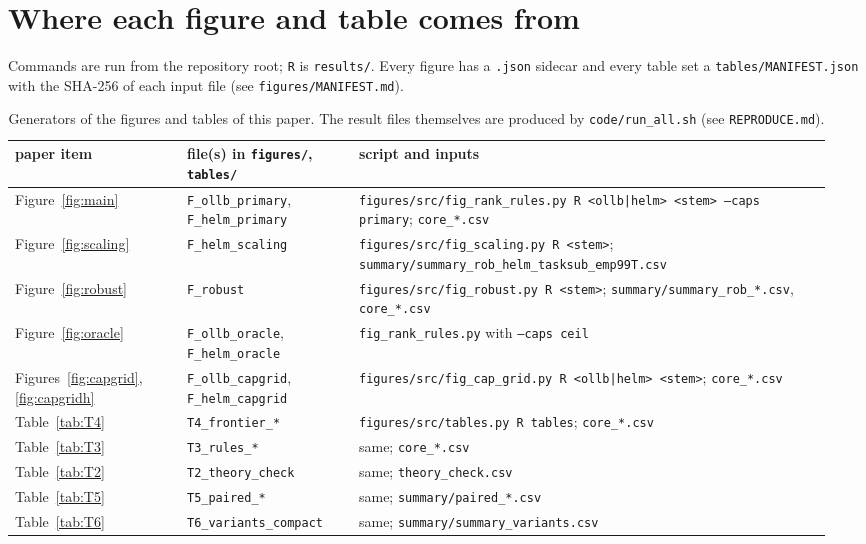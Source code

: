 \documentclass{article}
\begin{document}
\section{Where each figure and table comes from}
\label{app:map}
Commands are run from the repository root; \texttt{R} is \texttt{results/}. Every figure has a \texttt{.json} sidecar and every table set a \texttt{tables/MANIFEST.json} with the SHA-256 of each input file (see \texttt{figures/MANIFEST.md}).
\begin{table}[h]
\centering\scriptsize
\begin{tabular}{@{}p{0.2\linewidth}p{0.2\linewidth}p{0.55\linewidth}@{}}
\toprule
paper item & file(s) in \texttt{figures/}, \texttt{tables/} & script and inputs \\
\midrule
Figure~\ref{fig:main} & \texttt{F\_ollb\_primary}, \texttt{F\_helm\_primary} & \texttt{figures/src/fig\_rank\_rules.py R <ollb|helm> <stem> --caps primary}; \texttt{core\_*.csv} \\
Figure~\ref{fig:scaling} & \texttt{F\_helm\_scaling} & \texttt{figures/src/fig\_scaling.py R <stem>}; \texttt{summary/summary\_rob\_helm\_tasksub\_emp99T.csv} \\
Figure~\ref{fig:robust} & \texttt{F\_robust} & \texttt{figures/src/fig\_robust.py R <stem>}; \texttt{summary/summary\_rob\_*.csv}, \texttt{core\_*.csv} \\
Figure~\ref{fig:oracle} & \texttt{F\_ollb\_oracle}, \texttt{F\_helm\_oracle} & \texttt{fig\_rank\_rules.py} with \texttt{--caps ceil} \\
Figures~\ref{fig:capgrid}, \ref{fig:capgridh} & \texttt{F\_ollb\_capgrid}, \texttt{F\_helm\_capgrid} & \texttt{figures/src/fig\_cap\_grid.py R <ollb|helm> <stem>}; \texttt{core\_*.csv} \\
Table~\ref{tab:T4} & \texttt{T4\_frontier\_*} & \texttt{figures/src/tables.py R tables}; \texttt{core\_*.csv} \\
Table~\ref{tab:T3} & \texttt{T3\_rules\_*} & same; \texttt{core\_*.csv} \\
Table~\ref{tab:T2} & \texttt{T2\_theory\_check} & same; \texttt{theory\_check.csv} \\
Table~\ref{tab:T5} & \texttt{T5\_paired\_*} & same; \texttt{summary/paired\_*.csv} \\
Table~\ref{tab:T6} & \texttt{T6\_variants\_compact} & same; \texttt{summary/summary\_variants.csv} \\
\bottomrule
\end{tabular}
\caption{Generators of the figures and tables of this paper. The result files themselves are produced by \texttt{code/run\_all.sh} (see \texttt{REPRODUCE.md}).}
\end{table}
\end{document}
